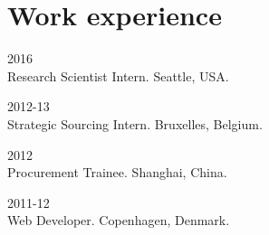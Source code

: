 \section*{Work experience}

\begin{paracol}{2}
  \textsc{2016}
\switchcolumn
  \\
  Research Scientist Intern. Seattle, USA.
\end{paracol}

\begin{paracol}{2}
  \textsc{2012-13}
\switchcolumn
  \\
  Strategic Sourcing Intern. Bruxelles, Belgium.
\end{paracol}

\begin{paracol}{2}
  \textsc{2012}
\switchcolumn
  \\
  Procurement Trainee. Shanghai, China.
\end{paracol}

\begin{paracol}{2}
  \textsc{2011-12}
\switchcolumn
  \\
  Web Developer. Copenhagen, Denmark.
\end{paracol}

\pagebreak %